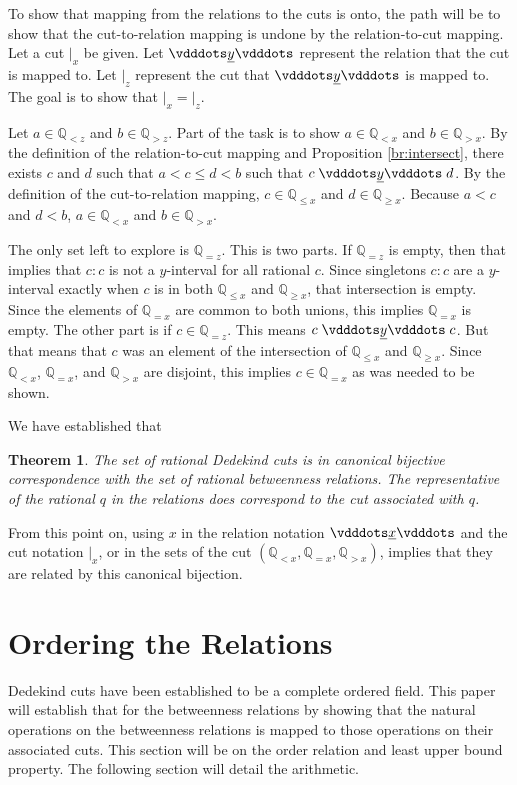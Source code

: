 \documentclass[12pt]{article}
\newtheorem{theorem}{Theorem}[section]
\newcommand{\qcut}[2][x]{\ensuremath{\mathbb{Q}_{#2 #1}}}
\newcommand{\qlt}[1][x]{\qcut[#1]{<}}
\newcommand{\qeq}[1][x]{\qcut[#1]{=}}
\newcommand{\qgt}[1][x]{\qcut[#1]{>}}
\newcommand{\qgeq}[1][x]{\qcut[#1]{\geq}}
\newcommand{\qleq}[1][x]{\qcut[#1]{\leq}}
\newcommand{\cut}[1][x]{{\vert}_{#1} }
\newcommand{\yrel}{\xrel[y]}
\begin{document}
To show that mapping from the relations to the cuts is onto, the path will be to show that the cut-to-relation mapping is undone by the relation-to-cut mapping. Let a cut $\cut$ be given. Let $\yrel$ represent the relation that the cut is mapped to. Let $\cut[z]$ represent the cut that $\yrel$ is mapped to. The goal is to show that $\cut = \cut[z]$.  

Let $a \in \qlt[z]$ and $b \in \qgt[z]$. Part of the task is to show $a \in \qlt$ and $b \in \qgt$. By the definition of the relation-to-cut mapping and Proposition \ref{br:intersect}, there exists $c$ and $d$ such that $a < c \leq d < b$ such that $c \yrel d$. By the definition of the cut-to-relation mapping, $c \in \qleq$ and $d \in \qgeq$. Because $a < c$ and $ d < b$, $a \in \qlt$ and $b \in \qgt$. 

The only set left to explore is $\qeq[z]$. This is two parts. If $\qeq[z]$ is empty, then that implies that $c:c$ is not a $y$-interval for all rational $c$. Since singletons $c:c$ are a $y$-interval exactly when $c$ is in both $\qleq$ and $\qgeq$, that intersection is empty. Since the elements of $\qeq$ are common to both unions, this implies $\qeq$ is empty. The other part is if $c \in \qeq[z]$. This means $c \yrel c$. But that means that $c$ was an element of the intersection of $\qleq$ and $\qgeq$. Since $\qlt$, $\qeq$, and $\qgt$ are disjoint, this implies $c \in \qeq$ as was needed to be shown. 


We have established that
\begin{theorem}
    The set of rational Dedekind cuts is in canonical bijective correspondence with the set of rational betweenness relations. The representative of the rational $q$ in the relations does correspond to the cut associated with $q$.
\end{theorem}

From this point on, using $x$ in the relation notation $\xrel$ and the cut notation $\cut$, or in the sets of the cut $(\qlt, \qeq, \qgt)$, implies that they are related by this canonical bijection. 

\section{Ordering the Relations}

Dedekind cuts have been established to be a complete ordered field. This paper will establish that for the betweenness relations by showing that the natural operations on the betweenness relations is mapped to those operations on their associated cuts. This section will be on the order relation and least upper bound property. The following section will detail the arithmetic. 
\end{document}
